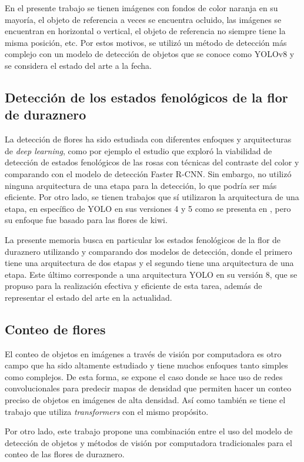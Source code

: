 En el presente trabajo se tienen imágenes con fondos de color naranja en su mayoría, el objeto de referencia a veces se encuentra ocluido, las imágenes se encuentran en horizontal o vertical, el objeto de referencia no siempre tiene la misma posición, etc. Por estos motivos, se utilizó un método de detección más complejo con un modelo de detección de objetos que se conoce como YOLOv8 y se considera el estado del arte a la fecha.

\subsection{Detección de los estados fenológicos de la flor de duraznero}
 
La detección de flores ha sido estudiada con diferentes enfoques y arquitecturas de \textit{deep learning}, como por ejemplo el estudio \cite{ARTICLE:3} que exploró la viabilidad de detección de estados fenológicos de las rosas con técnicas del contraste del color y comparando con el modelo de detección Faster R-CNN. Sin embargo, no utilizó ninguna arquitectura de una etapa para la detección, lo que podría ser más eficiente. Por otro lado, se tienen trabajos que sí utilizaron la arquitectura de una etapa, en específico de YOLO en sus versiones 4 y 5 como se presenta en \cite{ARTICLE:4} \cite{ARTICLE:5}, pero su enfoque fue basado para las flores de kiwi.

La presente memoria busca en particular los estados fenológicos de la flor de duraznero utilizando y comparando dos modelos de detección, donde el primero tiene una arquitectura de dos etapas y el segundo tiene una arquitectura de una etapa. Este último corresponde a una arquitectura YOLO en su versión 8, que se propuso para la realización efectiva y eficiente de esta tarea, además de representar el estado del arte en la actualidad.

\subsection{Conteo de flores}

El conteo de objetos en imágenes a través de visión por computadora es otro campo que ha sido altamente estudiado y tiene muchos enfoques tanto simples como complejos. De esta forma, se expone el caso \cite{ARTICLE:6} donde se hace uso de redes convolucionales para predecir mapas de densidad que permiten hacer un conteo preciso de objetos en imágenes de alta densidad. Así como también se tiene el trabajo \cite{ARTICLE:7} que utiliza \textit{transformers} con el mismo propósito.

Por otro lado, este trabajo propone una combinación entre el uso del modelo de detección de objetos y métodos de visión por computadora tradicionales para el conteo de las flores de duraznero.





